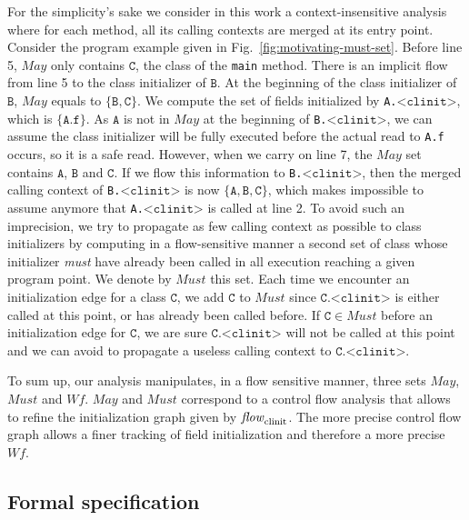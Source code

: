 \documentclass{entcs}
\newcommand{\clinit}{\ensuremath{\texttt{<clinit>}}}
\newcommand{\may}{\ensuremath{\mathit{May}}}
\newcommand{\must}{\ensuremath{\mathit{Must}}}
\newcommand{\wf}{\ensuremath{\mathit{Wf}}}
\newcommand{\flow}{\mathit{flow}}
\newcommand{\clinitflow}{\flow_{\rm clinit}}
\begin{document}
For the simplicity's sake we consider in this work a
context-insensitive analysis where for each method, all its calling
contexts are merged at its entry point.
Consider the program example given in
Fig.~\ref{fig:motivating-must-set}.  Before line 5, \may{} only
contains $\mathtt{C}$, the class of the \texttt{main} method.  There
is an implicit flow from line 5 to the class initializer of
$\mathtt{B}$.  At the beginning of the class initializer of
$\mathtt{B}$, \may{} equals to $\{\mathtt{B},\mathtt{C}\}$.  We
compute the set of fields initialized by \texttt{A.\clinit}, which is
$\{\mathtt{A.f}\}$.  As $\mathtt{A}$ is not in \may{} at the beginning
of \texttt{B.\clinit}, we can assume the class initializer will be
fully executed before the actual read to \texttt{A.f} occurs, so it is
a safe read.  However, when we carry on line 7, the \may{} set
contains $\mathtt{A}$, $\mathtt{B}$ and $\mathtt{C}$.  If we flow this
information to \texttt{B.\clinit}, then the merged calling context of
\texttt{B.\clinit} is now $\{\mathtt{A},\mathtt{B},\mathtt{C}\}$,
which makes impossible to assume anymore that \texttt{A.\clinit} is
called at line 2.
To avoid such an imprecision, we try to propagate as few calling
context as possible to class initializers by computing in a
flow-sensitive manner a second set of class whose initializer
\emph{must} have already been called in all execution reaching a given
program point.  We denote by $\must$ this set.  Each time we encounter
an initialization edge for a class $\mathtt{C}$, we add $\mathtt{C}$
to $\must$ since $\mathtt{C}.\clinit$ is either called at this point,
or has already been called before.  If $\mathtt{C}\in\must$ before an
initialization edge for $\mathtt{C}$, we are sure $\mathtt{C}.\clinit$
will not be called at this point and we can avoid to propagate a
useless calling context to $\mathtt{C}.\clinit$.

To sum up, our analysis manipulates, in a flow sensitive manner, three
sets $\may$, $\must$ and $\wf$. $\may$ and $\must$ correspond to
a control flow analysis that allows to refine the
initialization graph given by $\clinitflow$.
The more precise control flow graph allows a finer tracking of field
initialization and therefore a more precise $\wf$.

\subsection{Formal specification}
\label{sec:formal-specification}
\end{document}
